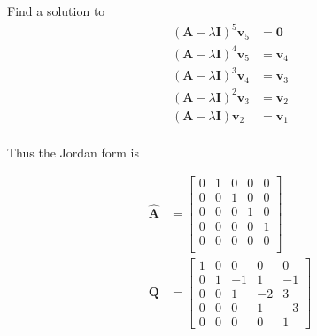 \begin{itemize}
Find a solution to
\begin{align*}
(\mathbf{A}-\lambda \mathbf{I})^5 \mathbf{v}_5& = \mathbf{0} \\
(\mathbf{A}-\lambda \mathbf{I})^4 \mathbf{v}_5& = \mathbf{v}_4 \\
(\mathbf{A}-\lambda \mathbf{I})^3 \mathbf{v}_4& = \mathbf{v}_3 \\
(\mathbf{A}-\lambda \mathbf{I})^2 \mathbf{v}_3& = \mathbf{v}_2 \\
(\mathbf{A}-\lambda \mathbf{I}) \mathbf{v}_2& = \mathbf{v}_1 \\
\end{align*}


 Thus the Jordan form is

 \begin{align*}
 \hat {\mathbf{A}} &= \begin{bmatrix}
                       0 & 1 & 0 & 0 & 0\\
                       0 & 0 & 1 & 0 & 0\\
                        0 & 0 & 0 & 1 & 0\\
                        0 & 0 & 0 & 0 & 1\\
                        0 & 0 & 0 & 0 & 0\\
                      \end{bmatrix}\\
  \mathbf{Q} &= \begin{bmatrix}
                    1 & 0 & 0 & 0 & 0\\
                    0 & 1 & -1 & 1 & -1\\
                    0 & 0 & 1 & -2 & 3\\
                    0 & 0 & 0 & 1 & -3\\
                    0 & 0 & 0 & 0 & 1
  \end{bmatrix}
 \end{align*}

\end{itemize}
